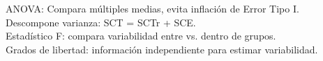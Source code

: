\documentclass[preview]{standalone}
\begin{document}
\begin{center}
ANOVA: Compara m\'ultiples medias, evita inflaci\'on de Error Tipo I.\\Descompone varianza: SCT = SCTr + SCE.\\Estad\'istico F: compara variabilidad entre vs. dentro de grupos.\\Grados de libertad: informaci\'on independiente para estimar variabilidad.
\end{center}
\end{document}

